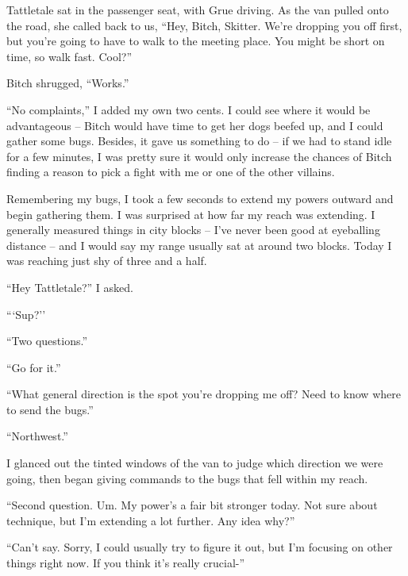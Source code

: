 Tattletale sat in the passenger seat, with Grue driving.  As the van pulled onto the road, she called back to us, ``Hey, Bitch, Skitter.  We're dropping you off first, but you're going to have to walk to the meeting place.  You might be short on time, so walk fast.  Cool?''



Bitch shrugged, ``Works.''



``No complaints,'' I added my own two cents.  I could see where it would be advantageous – Bitch would have time to get her dogs beefed up, and I could gather some bugs.  Besides, it gave us something to do – if we had to stand idle for a few minutes, I was pretty sure it would only increase the chances of Bitch finding a reason to pick a fight with me or one of the other villains.



Remembering my bugs, I took a few seconds to extend my powers outward and begin gathering them.  I was surprised at how far my reach was extending.  I generally measured things in city blocks – I've never been good at eyeballing distance – and I would say my range usually sat at around two blocks.  Today I was reaching just shy of three and a half.



``Hey Tattletale?'' I asked.



```Sup?''



``Two questions.''



``Go for it.''



``What general direction is the spot you're dropping me off?  Need to know where to send the bugs.''



``Northwest.''



I glanced out the tinted windows of the van to judge which direction we were going, then began giving commands to the bugs that fell within my reach.



``Second question.  Um.  My power's a fair bit stronger today.  Not sure about technique, but I'm extending a lot further.  Any idea why?''



``Can't say.  Sorry, I could usually try to figure it out, but I'm focusing on other things right now.  If you think it's really crucial-''



